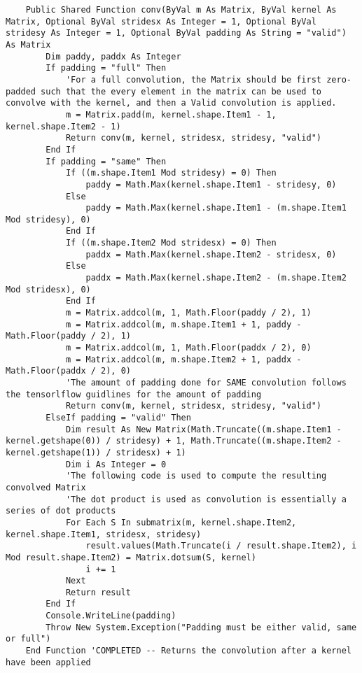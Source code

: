 \begin{verbatim}
    Public Shared Function conv(ByVal m As Matrix, ByVal kernel As Matrix, Optional ByVal stridesx As Integer = 1, Optional ByVal stridesy As Integer = 1, Optional ByVal padding As String = "valid") As Matrix
        Dim paddy, paddx As Integer
        If padding = "full" Then
            'For a full convolution, the Matrix should be first zero-padded such that the every element in the matrix can be used to convolve with the kernel, and then a Valid convolution is applied.
            m = Matrix.padd(m, kernel.shape.Item1 - 1, kernel.shape.Item2 - 1)
            Return conv(m, kernel, stridesx, stridesy, "valid")
        End If
        If padding = "same" Then
            If ((m.shape.Item1 Mod stridesy) = 0) Then
                paddy = Math.Max(kernel.shape.Item1 - stridesy, 0)
            Else
                paddy = Math.Max(kernel.shape.Item1 - (m.shape.Item1 Mod stridesy), 0)
            End If
            If ((m.shape.Item2 Mod stridesx) = 0) Then
                paddx = Math.Max(kernel.shape.Item2 - stridesx, 0)
            Else
                paddx = Math.Max(kernel.shape.Item2 - (m.shape.Item2 Mod stridesx), 0)
            End If
            m = Matrix.addcol(m, 1, Math.Floor(paddy / 2), 1)
            m = Matrix.addcol(m, m.shape.Item1 + 1, paddy - Math.Floor(paddy / 2), 1)
            m = Matrix.addcol(m, 1, Math.Floor(paddx / 2), 0)
            m = Matrix.addcol(m, m.shape.Item2 + 1, paddx - Math.Floor(paddx / 2), 0)
            'The amount of padding done for SAME convolution follows the tensorlflow guidlines for the amount of padding
            Return conv(m, kernel, stridesx, stridesy, "valid")
        ElseIf padding = "valid" Then
            Dim result As New Matrix(Math.Truncate((m.shape.Item1 - kernel.getshape(0)) / stridesy) + 1, Math.Truncate((m.shape.Item2 - kernel.getshape(1)) / stridesx) + 1)
            Dim i As Integer = 0
            'The following code is used to compute the resulting convolved Matrix
            'The dot product is used as convolution is essentially a series of dot products
            For Each S In submatrix(m, kernel.shape.Item2, kernel.shape.Item1, stridesx, stridesy)
                result.values(Math.Truncate(i / result.shape.Item2), i Mod result.shape.Item2) = Matrix.dotsum(S, kernel)
                i += 1
            Next
            Return result
        End If
        Console.WriteLine(padding)
        Throw New System.Exception("Padding must be either valid, same or full")
    End Function 'COMPLETED -- Returns the convolution after a kernel have been applied


\end{verbatim}
